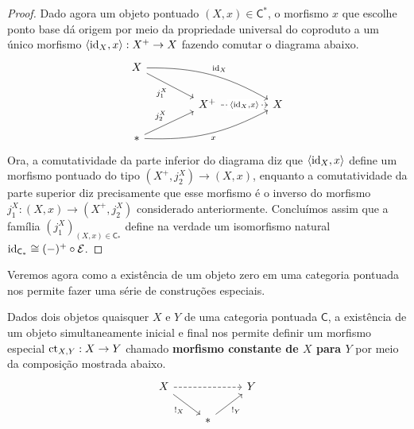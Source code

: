 \begin{proof}
  Dado agora um objeto pontuado $(X,x) \in \mathsf{C}^{*}$, o morfismo $x$ que escolhe ponto base dá origem por meio da propriedade universal do coproduto a um único morfismo $\langle \mathrm{id}_{X},x \rangle: X^{+} \to X$ fazendo comutar o diagrama abaixo.
  \begin{displaymath}
    \begin{tikzcd}[column sep=1.5cm]
      X
      \arrow[rrd, bend left=15, "\id_{X}"]
      \arrow[rd, "j^{X}_{1}" swap]
      \\ & X^{+}
      \arrow[r, dashed, "{\langle \id_{X},x \rangle}" description]
      & X
      \\ *
      \arrow[ru, "j^{X}_{2}"]
      \arrow[rru, bend right=15, "x" swap]
    \end{tikzcd}
  \end{displaymath}
  Ora, a comutatividade da parte inferior do diagrama diz que $\langle \mathrm{id}_{X},x \rangle$ define um morfismo pontuado do tipo $(X^{+},j^{X}_{2}) \to (X,x)$, enquanto a comutatividade da parte superior diz precisamente que esse morfismo é o inverso do morfismo $j^{X}_{1}: (X,x) \to (X^{+},j^{X}_{2})$ considerado anteriormente.
  Concluímos assim que a família $(j^{X}_{1})_{(X,x) \in \mathsf{C}_{*}}$ define na verdade um isomorfismo natural $\mathrm{id}_{\mathsf{C}_{*}} \cong (-)^{+} \circ \mathcal{E}$.
\end{proof}

Veremos agora como a existência de um objeto zero em uma categoria pontuada nos permite fazer uma série de construções especiais.

Dados dois objetos quaisquer $X$ e $Y$ de uma categoria pontuada $\mathsf{C}$, a existência de um objeto simultaneamente inicial e final nos permite definir um morfismo especial $\mathrm{ct}_{X,Y}: X \to Y$ chamado \textbf{morfismo constante de $X$ para $Y$} por meio da composição mostrada abaixo.
\begin{displaymath}
  \begin{tikzcd}
    X
    \arrow[rd, "!_{X}" swap]
    \arrow[rr, dashed]
    & & Y
    \\ & *
    \arrow[ru, "!_{Y}" swap]
  \end{tikzcd}
\end{displaymath}

